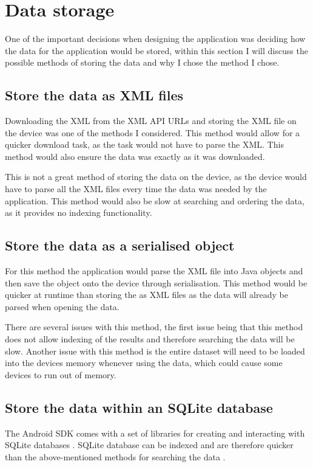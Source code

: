 \section{Data storage}
One of the important decisions when designing the application was deciding how the data for the application would be stored, within this section I will discuss the possible methods of storing the data and why I chose the method I chose.

\subsection{Store the data as XML files}

Downloading the XML from the XML API URLs and storing the XML file \cite{xml} on the device was one of the methods I considered. This method would allow for a quicker download task, as the task would not have to parse the XML. This method would also ensure the data was exactly as it was downloaded.

This is not a great method of storing the data on the device, as the device would have to parse all the XML files every time the data was needed by the application. This method would also be slow at searching and ordering the data, as it provides no indexing functionality.

\subsection{Store the data as a serialised object}

For this method the application would parse the XML file \cite{xml} into Java \cite{java} objects and then save the object onto the device through serialisation. This method would be quicker at runtime than storing the as XML files as the data will already be parsed when opening the data. 

There are several issues with this method, the first issue being that this method does not allow indexing of the results and therefore searching the data will be slow. Another issue with this method is the entire dataset will need to be loaded into the devices memory whenever using the data, which could cause some devices to run out of memory.

\subsection{Store the data within an SQLite database}

The Android SDK \cite{android_sdk} comes with a set of libraries for creating and interacting with SQLite databases \cite{sqlite}. SQLite database can be indexed and are therefore quicker than the above-mentioned methods for searching the data \cite{sqlite}. 

